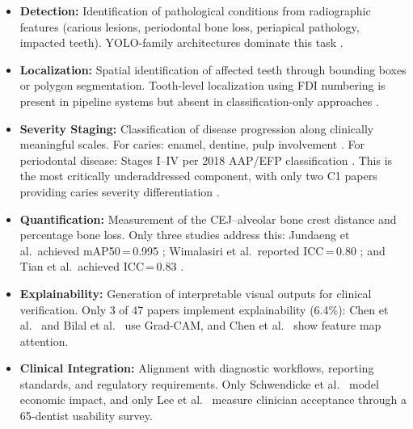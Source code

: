 \documentclass[conference]{IEEEtran}
\begin{document}
\begin{itemize}
    \item \textbf{Detection:} Identification of pathological conditions
          from radiographic features (carious lesions, periodontal bone
          loss, periapical pathology, impacted teeth). YOLO-family
          architectures dominate this task
          \cite{ayhan2025detection,nassiri2025yolo,chen2024cariesxrays,
          bizjak2024advancing,pornprasertsuk2025clinical}.

    \item \textbf{Localization:} Spatial identification of affected
          teeth through bounding boxes or polygon segmentation.
          Tooth-level localization using FDI numbering is present in
          pipeline systems
          \cite{jundaeng2025advanced,chen2024cariesxrays,bizjak2024advancing,
          pornprasertsuk2025clinical} but absent in
          classification-only approaches
          \cite{kaushik2025densenet201,mathur2025comparative,ozdemir2026enhanced}.

    \item \textbf{Severity Staging:} Classification of disease
          progression along clinically meaningful scales. For caries:
          enamel, dentine, pulp involvement
          \cite{asadi2024detection,bizjak2024advancing}. For
          periodontal disease: Stages I--IV per 2018 AAP/EFP
          classification \cite{chmielewski20252018}. This is the most
          critically underaddressed component, with only two C1 papers
          providing caries severity differentiation
          \cite{bizjak2024advancing,asadi2024detection}.

    \item \textbf{Quantification:} Measurement of the CEJ--alveolar
          bone crest distance and percentage bone loss. Only three
          studies address this: Jundaeng et al.\ achieved
          mAP50\,=\,0.995 \cite{jundaeng2025advanced}; Wimalasiri et
          al.\ reported ICC\,=\,0.80 \cite{wimalasiri2025ai}; and Tian
          et al.\ achieved ICC\,=\,0.83 \cite{tian2025development}.

    \item \textbf{Explainability:} Generation of interpretable visual
          outputs for clinical verification. Only 3 of 47 papers
          implement explainability (6.4\%): Chen et al.\
          \cite{chen2023deep} and Bilal et al.\ \cite{bilal2024pdcnet}
          use Grad-CAM, and Chen et al.\ \cite{chen2024cariesxrays}
          show feature map attention.

    \item \textbf{Clinical Integration:} Alignment with diagnostic
          workflows, reporting standards, and regulatory requirements.
          Only Schwendicke et al.\ \cite{schwendicke2021cost} model
          economic impact, and only Lee et al.\ \cite{lee2025evaluation}
          measure clinician acceptance through a 65-dentist usability
          survey.
\end{itemize}
\end{document}
